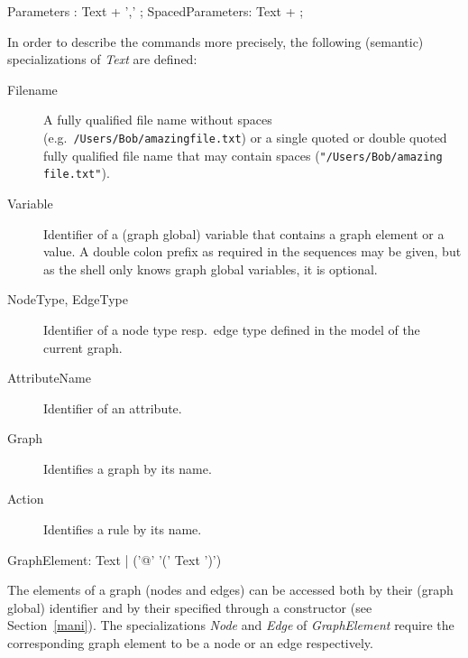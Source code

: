 \begin{rail}
 Parameters : Text + ',' ;
 SpacedParameters: Text + ;
\end{rail}

In order to describe the commands more precisely, the following (semantic) specializations of \emph{Text} are defined:
\begin{description}
  \item[Filename]A fully qualified file name without spaces (e.g.\ \texttt{/Users/Bob/amazing\textunderscore file.txt}) or a single quoted or double quoted fully qualified file name that may contain spaces (\texttt{"/Users/Bob/amazing file.txt"}).
  \item[Variable] Identifier of a (graph global) variable that contains a graph element or a value.  A double colon prefix as required in the sequences may be given, but as the shell only knows graph global variables, it is optional.
  \item[NodeType, EdgeType] Identifier of a node type resp.\ edge type defined in the model of the current graph.
  \item[AttributeName] Identifier of an attribute.
  \item[Graph] Identifies a graph by its name.
  \item[Action] Identifies a rule by its name.
\end{description}
\makeatletter
\begin{rail}
  GraphElement: Text | ('@' '(' Text ')')
\end{rail}
\makeatother

The elements of a graph (nodes and edges) can be accessed both by their (graph global)  identifier and by their  specified through a constructor (see Section~\ref{mani}).
The specializations \emph{Node} and \emph{Edge} of \emph{GraphElement} require the corresponding graph element to be a node or an edge respectively.

